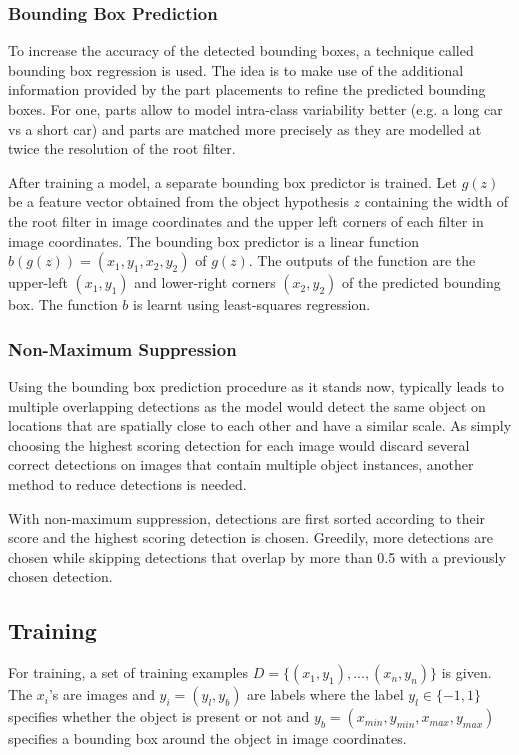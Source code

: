 \subsubsection{Bounding Box Prediction}
To increase the accuracy of the detected bounding boxes, a technique called bounding box regression is used. The idea is to make use of the additional information provided by the part placements to refine the predicted bounding boxes. For one, parts allow to model intra-class variability better (e.g. a long car vs a short car) and parts are matched more precisely as they are modelled at twice the resolution of the root filter. 

After training a model, a separate bounding box predictor is trained. Let $g(z)$ be a feature vector obtained from the object hypothesis $z$ containing the width of the root filter in image coordinates and the upper left corners of each filter in image coordinates. The bounding box predictor is a linear function $b(g(z))=(x_1,y_1,x_2,y_2)$ of $g(z)$. The outputs of the function are the upper-left $(x_1,y_1)$ and lower-right corners $(x_2,y_2)$ of the predicted bounding box. The function $b$ is learnt using least-squares regression.

\subsubsection{Non-Maximum Suppression}
Using the bounding box prediction procedure as it stands now, typically leads to multiple overlapping detections as the model would detect the same object on locations that are spatially close to each other and have a similar scale. As simply choosing the highest scoring detection for each image would discard several correct detections on images that contain multiple object instances, another method to reduce detections is needed. 

With non-maximum suppression, detections are first sorted according to their score and the highest scoring detection is chosen. Greedily, more detections are chosen while skipping detections that overlap by more than 0.5 with a previously chosen detection.

\subsection{Training}

For training, a set of training examples $D=\{(x_1,y_1),...,(x_n,y_n)\}$ is given. The $x_i$'s are images and $y_i=(y_l,y_b)$ are labels where the label $y_l\in\{-1,1\}$ specifies whether the object is present or not and $y_b=(x_{min},y_{min},x_{max},y_{max})$ specifies a bounding box around the object in image coordinates. 

